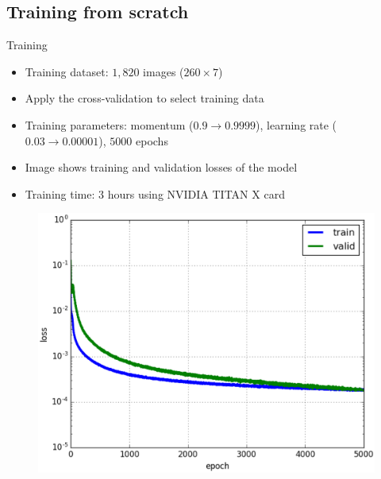 \documentclass[10pt,svgnames]{beamer}
\begin{document}
\subsection{Training from scratch}
\begin{frame}{Training}{}
	\begin{itemize}
		\item Training dataset: \textbf{$1,820$} images ($260 \times 7$)
		\item Apply the cross-validation to select training data
		\item Training parameters: momentum ($0.9 \rightarrow 0.9999$), learning rate ($0.03 \rightarrow 0.00001$), $5000$ epochs\footnotemark
		\item Image shows training and validation losses of the model
		\item Training time: 3 hours using NVIDIA TITAN X card
	\end{itemize}
	\begin{center}
     \begin{figure}[htbp]
        \centering
        \includegraphics[scale=.30]{images/loss_model_3}
    	\label{figrsexample1}
	\end{figure}
  \end{center}
	
\end{frame}
\end{document}
